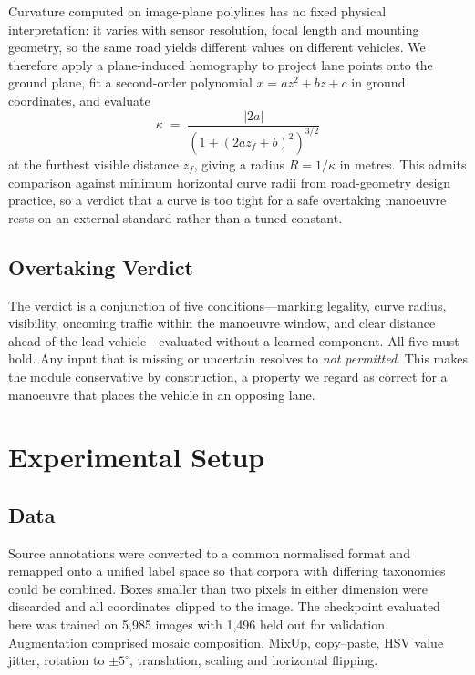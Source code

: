 \documentclass[conference]{IEEEtran}
\begin{document}
Curvature computed on image-plane polylines has no fixed physical interpretation:
it varies with sensor resolution, focal length and mounting geometry, so the same
road yields different values on different vehicles. We therefore apply a
plane-induced homography \cite{hartley2004multiple} to project lane points onto
the ground plane, fit a second-order polynomial $x = a z^2 + bz + c$ in
ground coordinates, and evaluate
\begin{equation}
  \kappa \;=\; \frac{|2a|}{\left(1 + (2az_f + b)^2\right)^{3/2}}
\end{equation}
at the furthest visible distance $z_f$, giving a radius $R = 1/\kappa$ in metres.
This admits comparison against minimum horizontal curve radii from road-geometry
design practice, so a verdict that a curve is too tight for a safe overtaking
manoeuvre rests on an external standard rather than a tuned constant.

\subsection{Overtaking Verdict}

The verdict is a conjunction of five conditions---marking legality, curve
radius, visibility, oncoming traffic within the manoeuvre window, and clear
distance ahead of the lead vehicle---evaluated without a learned component. All
five must hold. Any input that is missing or uncertain resolves to
\textit{not permitted}. This makes the module conservative by construction, a
property we regard as correct for a manoeuvre that places the vehicle in an
opposing lane.

\section{Experimental Setup}

\subsection{Data}

Source annotations were converted to a common normalised format and remapped
onto a unified label space so that corpora with differing taxonomies could be
combined. Boxes smaller than two pixels in either dimension were discarded and
all coordinates clipped to the image. The checkpoint evaluated here was trained
on 5{,}985 images with 1{,}496 held out for validation. Augmentation comprised
mosaic composition, MixUp, copy--paste, HSV value jitter, rotation to
$\pm5^{\circ}$, translation, scaling and horizontal flipping.
\end{document}
